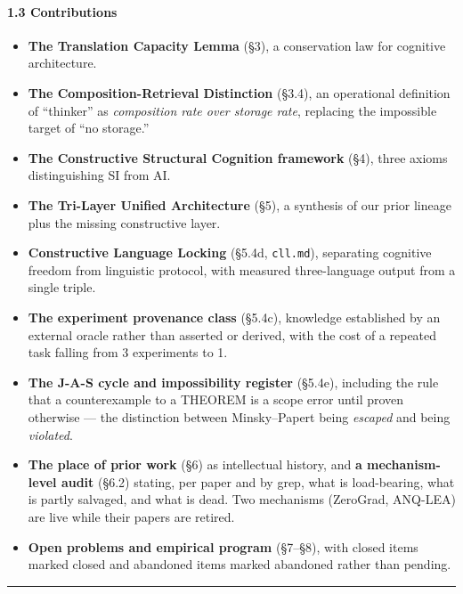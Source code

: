 \documentclass[
  11pt,
  a4paper,
]{article}
\providecommand{\tightlist}{%
  \setlength{\itemsep}{0pt}\setlength{\parskip}{0pt}}
\begin{document}
\paragraph{1.3 Contributions}\label{contributions}

\begin{itemize}
\tightlist
\item
  \textbf{The Translation Capacity Lemma} (§3), a conservation law for
  cognitive architecture.
\item
  \textbf{The Composition-Retrieval Distinction} (§3.4), an operational
  definition of ``thinker'' as \emph{composition rate over storage
  rate}, replacing the impossible target of ``no storage.''
\item
  \textbf{The Constructive Structural Cognition framework} (§4), three
  axioms distinguishing SI from AI.
\item
  \textbf{The Tri-Layer Unified Architecture} (§5), a synthesis of our
  prior lineage plus the missing constructive layer.
\item
  \textbf{Constructive Language Locking} (§5.4d, \texttt{cll.md}),
  separating cognitive freedom from linguistic protocol, with measured
  three-language output from a single triple.
\item
  \textbf{The experiment provenance class} (§5.4c), knowledge
  established by an external oracle rather than asserted or derived,
  with the cost of a repeated task falling from 3 experiments to 1.
\item
  \textbf{The J-A-S cycle and impossibility register} (§5.4e), including
  the rule that a counterexample to a THEOREM is a scope error until
  proven otherwise --- the distinction between Minsky--Papert being
  \emph{escaped} and being \emph{violated}.
\item
  \textbf{The place of prior work} (§6) as intellectual history, and
  \textbf{a mechanism-level audit} (§6.2) stating, per paper and by
  grep, what is load-bearing, what is partly salvaged, and what is dead.
  Two mechanisms (ZeroGrad, ANQ-LEA) are live while their papers are
  retired.
\item
  \textbf{Open problems and empirical program} (§7--§8), with closed
  items marked closed and abandoned items marked abandoned rather than
  pending.
\end{itemize}

\begin{center}\rule{0.5\linewidth}{0.5pt}\end{center}
\end{document}
